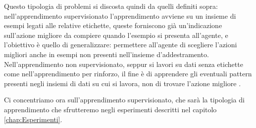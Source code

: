 \documentclass[../../main.tex]{subfiles}
\begin{document}
    Questo tipologia di problemi si discosta quindi da quelli definiti sopra: nell'apprendimento supervisionato l'apprendimento avviene su un insieme di esempi legati alle relative etichette, queste forniscono già un'indicazione sull'azione migliore da compiere quando l'esempio si presenta all'agente, e l'obiettivo è quello di generalizzare: permettere all'agente di scegliere l'azioni migliori anche in esempi non presenti nell'insieme d'addestramento.\\
     Nell'apprendimento non supervisionato, seppur si lavori su dati senza etichette come nell'apprendimento per rinforzo, il fine è di apprendere gli eventuali pattern presenti negli insiemi di dati su cui si lavora, non di trovare l'azione migliore \cite{Sutton1998}. 

    Ci concentriamo ora sull'apprendimento supervisionato, che sarà la tipologia di apprendimento che sfrutteremo negli esperimenti descritti nel capitolo \ref{chap:Esperimenti}.
    
\end{document}
